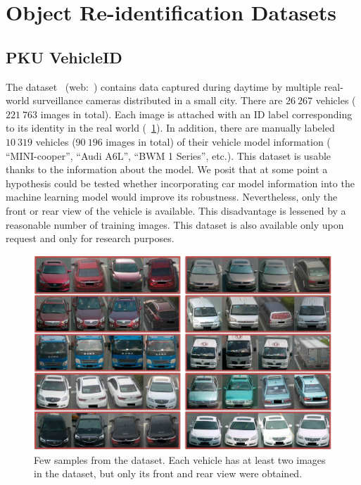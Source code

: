 \section{Object Re-identification Datasets}
\label{sec:ObjectReIDDatasets}

\subsection{PKU VehicleID}
\label{ssec:DatasetPKUVehicleID}

The  dataset~\cite{liu2016deepreldist} (web:~\cite{webpkuvehicledataset}) contains data captured during daytime by multiple real-world surveillance cameras distributed in a small city. There are $26\ 267$ vehicles ($221\ 763$ images in total). Each image is attached with an ID label corresponding to its identity in the real world (\figtext{}~\ref{fig:VehicleIDDataset}). In addition, there are manually labeled $10\ 319$ vehicles ($90\ 196$ images in total) of their vehicle model information (\ietext{} “MINI-cooper”, “Audi A6L”, “BWM 1 Series”, etc.). This dataset is usable thanks to the information about the model. We posit that at some point a hypothesis could be tested whether incorporating car model information into the machine learning model would improve its robustness. Nevertheless, only the front or rear view of the vehicle is available. This disadvantage is lessened by a reasonable number of training images. This dataset is also available only upon request and only for research purposes.

\begin{figure}[t]
    \centerline{\includegraphics[width=0.5\linewidth]{figures/datasets/vehicleid_overview.pdf}}
    \caption[ dataset]{Few samples from the  dataset. Each vehicle has at least two images in the dataset, but only its front and rear view were obtained. }
    \label{fig:VehicleIDDataset}
\end{figure}

